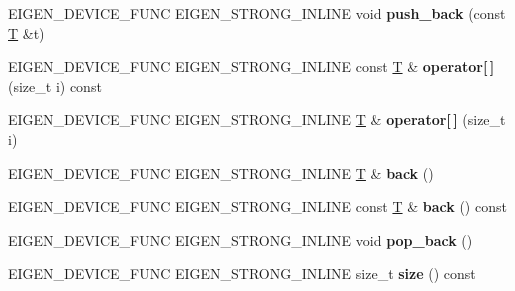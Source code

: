 \begin{DoxyCompactItemize}
E\+I\+G\+E\+N\+\_\+\+D\+E\+V\+I\+C\+E\+\_\+\+F\+U\+NC E\+I\+G\+E\+N\+\_\+\+S\+T\+R\+O\+N\+G\+\_\+\+I\+N\+L\+I\+NE void {\bfseries push\+\_\+back} (const \hyperlink{group___sparse_core___module}{T} \&t)
\item 
\mbox{\label{class_eigen_1_1_max_size_vector_a9d3808ef49363f9eebd424b7f66dbbea}} 
E\+I\+G\+E\+N\+\_\+\+D\+E\+V\+I\+C\+E\+\_\+\+F\+U\+NC E\+I\+G\+E\+N\+\_\+\+S\+T\+R\+O\+N\+G\+\_\+\+I\+N\+L\+I\+NE const \hyperlink{group___sparse_core___module}{T} \& {\bfseries operator\mbox{[}$\,$\mbox{]}} (size\+\_\+t i) const
\item 
\mbox{\label{class_eigen_1_1_max_size_vector_a78a4edb41153305d15a3daf2ec64b16c}} 
E\+I\+G\+E\+N\+\_\+\+D\+E\+V\+I\+C\+E\+\_\+\+F\+U\+NC E\+I\+G\+E\+N\+\_\+\+S\+T\+R\+O\+N\+G\+\_\+\+I\+N\+L\+I\+NE \hyperlink{group___sparse_core___module}{T} \& {\bfseries operator\mbox{[}$\,$\mbox{]}} (size\+\_\+t i)
\item 
\mbox{\label{class_eigen_1_1_max_size_vector_a3220d79e0c200d4bd05cd494ae47ae7b}} 
E\+I\+G\+E\+N\+\_\+\+D\+E\+V\+I\+C\+E\+\_\+\+F\+U\+NC E\+I\+G\+E\+N\+\_\+\+S\+T\+R\+O\+N\+G\+\_\+\+I\+N\+L\+I\+NE \hyperlink{group___sparse_core___module}{T} \& {\bfseries back} ()
\item 
\mbox{\label{class_eigen_1_1_max_size_vector_a777e17e8969e9af6e3e8ad99432085f8}} 
E\+I\+G\+E\+N\+\_\+\+D\+E\+V\+I\+C\+E\+\_\+\+F\+U\+NC E\+I\+G\+E\+N\+\_\+\+S\+T\+R\+O\+N\+G\+\_\+\+I\+N\+L\+I\+NE const \hyperlink{group___sparse_core___module}{T} \& {\bfseries back} () const
\item 
\mbox{\label{class_eigen_1_1_max_size_vector_a40a240932d0f051167b3ab3c4d93c76b}} 
E\+I\+G\+E\+N\+\_\+\+D\+E\+V\+I\+C\+E\+\_\+\+F\+U\+NC E\+I\+G\+E\+N\+\_\+\+S\+T\+R\+O\+N\+G\+\_\+\+I\+N\+L\+I\+NE void {\bfseries pop\+\_\+back} ()
\item 
\mbox{\label{class_eigen_1_1_max_size_vector_a126c2ea17157a14348222e5cb6a276ca}} 
E\+I\+G\+E\+N\+\_\+\+D\+E\+V\+I\+C\+E\+\_\+\+F\+U\+NC E\+I\+G\+E\+N\+\_\+\+S\+T\+R\+O\+N\+G\+\_\+\+I\+N\+L\+I\+NE size\+\_\+t {\bfseries size} () const
\item 

\end{DoxyCompactItemize}
